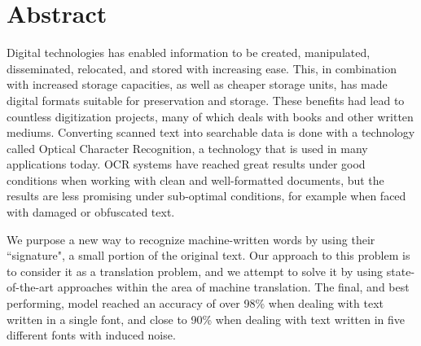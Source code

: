 
\chapter*{Abstract}
Digital technologies has enabled information to be created, manipulated, disseminated, relocated, and stored with increasing ease. This, in combination with increased storage capacities, as well as cheaper storage units, has made digital formats suitable for preservation and storage. These benefits had lead to countless digitization projects, many of which deals with books and other written mediums. Converting scanned text into searchable data is done with a technology called Optical Character Recognition, a technology that is used in many applications today. OCR systems have reached great results under good conditions when working with clean and well-formatted documents, but the results are less promising under sub-optimal conditions, for example when faced with damaged or obfuscated text. \newline

\noindent We purpose a new way to recognize machine-written words by using their ``signature", a small portion of the original text. Our approach to this problem is to consider it as a translation problem, and we attempt to solve it by using state-of-the-art approaches within the area of machine translation. The final, and best performing, model reached an accuracy of over 98\% when dealing with text written in a single font, and close to 90\% when dealing with text written in five different fonts with induced noise.